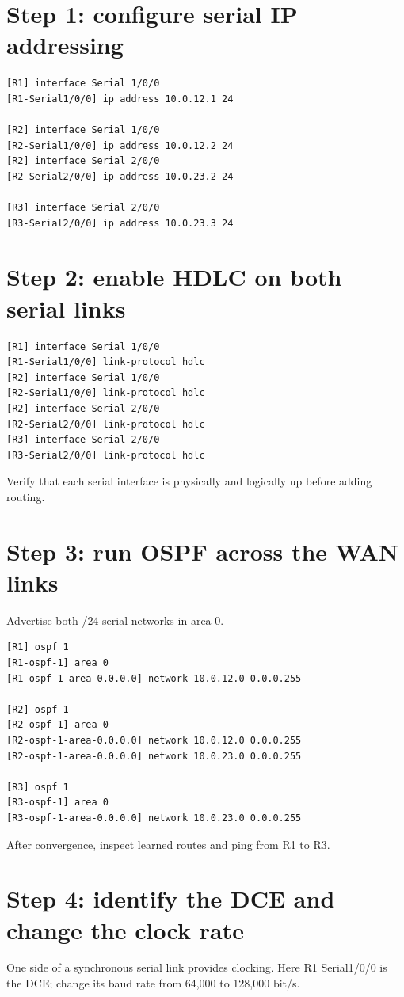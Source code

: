 \section{Step 1: configure serial IP addressing}
\begin{lstlisting}[style=dcnterminal]
[R1] interface Serial 1/0/0
[R1-Serial1/0/0] ip address 10.0.12.1 24

[R2] interface Serial 1/0/0
[R2-Serial1/0/0] ip address 10.0.12.2 24
[R2] interface Serial 2/0/0
[R2-Serial2/0/0] ip address 10.0.23.2 24

[R3] interface Serial 2/0/0
[R3-Serial2/0/0] ip address 10.0.23.3 24
\end{lstlisting}

\section{Step 2: enable HDLC on both serial links}
\begin{lstlisting}[style=dcnterminal]
[R1] interface Serial 1/0/0
[R1-Serial1/0/0] link-protocol hdlc
[R2] interface Serial 1/0/0
[R2-Serial1/0/0] link-protocol hdlc
[R2] interface Serial 2/0/0
[R2-Serial2/0/0] link-protocol hdlc
[R3] interface Serial 2/0/0
[R3-Serial2/0/0] link-protocol hdlc
\end{lstlisting}
Verify that each serial interface is physically and logically up before adding routing.

\section{Step 3: run OSPF across the WAN links}
Advertise both /24 serial networks in area 0.
\begin{lstlisting}[style=dcnterminal]
[R1] ospf 1
[R1-ospf-1] area 0
[R1-ospf-1-area-0.0.0.0] network 10.0.12.0 0.0.0.255

[R2] ospf 1
[R2-ospf-1] area 0
[R2-ospf-1-area-0.0.0.0] network 10.0.12.0 0.0.0.255
[R2-ospf-1-area-0.0.0.0] network 10.0.23.0 0.0.0.255

[R3] ospf 1
[R3-ospf-1] area 0
[R3-ospf-1-area-0.0.0.0] network 10.0.23.0 0.0.0.255
\end{lstlisting}
After convergence, inspect learned routes and ping from R1 to R3.

\section{Step 4: identify the DCE and change the clock rate}
One side of a synchronous serial link provides clocking. Here R1 Serial1/0/0 is the DCE; change its baud rate from 64,000 to 128,000 bit/s.

